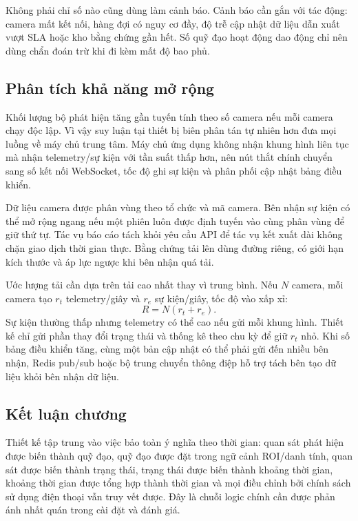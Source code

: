 Không phải chỉ số nào cũng dùng làm cảnh báo. Cảnh báo cần gắn với tác động: camera mất kết nối, hàng đợi có nguy cơ đầy, độ trễ cập nhật dữ liệu dẫn xuất vượt SLA hoặc kho bằng chứng gần hết. Số quỹ đạo hoạt động dao động chỉ nên dùng chẩn đoán trừ khi đi kèm mất độ bao phủ.

\subsection{Phân tích khả năng mở rộng}
Khối lượng bộ phát hiện tăng gần tuyến tính theo số camera nếu mỗi camera chạy độc lập. Vì vậy suy luận tại thiết bị biên phân tán tự nhiên hơn đưa mọi luồng về máy chủ trung tâm. Máy chủ ứng dụng không nhận khung hình liên tục mà nhận telemetry/sự kiện với tần suất thấp hơn, nên nút thắt chính chuyển sang số kết nối WebSocket, tốc độ ghi sự kiện và phân phối cập nhật bảng điều khiển.

Dữ liệu camera được phân vùng theo tổ chức và mã camera. Bên nhận sự kiện có thể mở rộng ngang nếu một phiên luôn được định tuyến vào cùng phân vùng để giữ thứ tự. Tác vụ báo cáo tách khỏi yêu cầu API để tác vụ kết xuất dài không chặn giao dịch thời gian thực. Bằng chứng tải lên dùng đường riêng, có giới hạn kích thước và áp lực ngược khi bên nhận quá tải.

Ước lượng tải cần dựa trên tải cao nhất thay vì trung bình. Nếu $N$ camera, mỗi camera tạo $r_t$ telemetry/giây và $r_e$ sự kiện/giây, tốc độ vào xấp xỉ:
\begin{equation}
 R=N(r_t+r_e).
\end{equation}
Sự kiện thường thấp nhưng telemetry có thể cao nếu gửi mỗi khung hình. Thiết kế chỉ gửi phần thay đổi trạng thái và thống kê theo chu kỳ để giữ $r_t$ nhỏ. Khi số bảng điều khiển tăng, cùng một bản cập nhật có thể phải gửi đến nhiều bên nhận, Redis pub/sub hoặc bộ trung chuyển thông điệp hỗ trợ tách bên tạo dữ liệu khỏi bên nhận dữ liệu.

\subsection{Kết luận chương}
Thiết kế tập trung vào việc bảo toàn ý nghĩa theo thời gian: quan sát phát hiện được biến thành quỹ đạo, quỹ đạo được đặt trong ngữ cảnh ROI/danh tính, quan sát được biến thành trạng thái, trạng thái được biến thành khoảng thời gian, khoảng thời gian được tổng hợp thành thời gian và mọi điều chỉnh bởi chính sách sử dụng điện thoại vẫn truy vết được. Đây là chuỗi logic chính cần được phản ánh nhất quán trong cài đặt và đánh giá.
